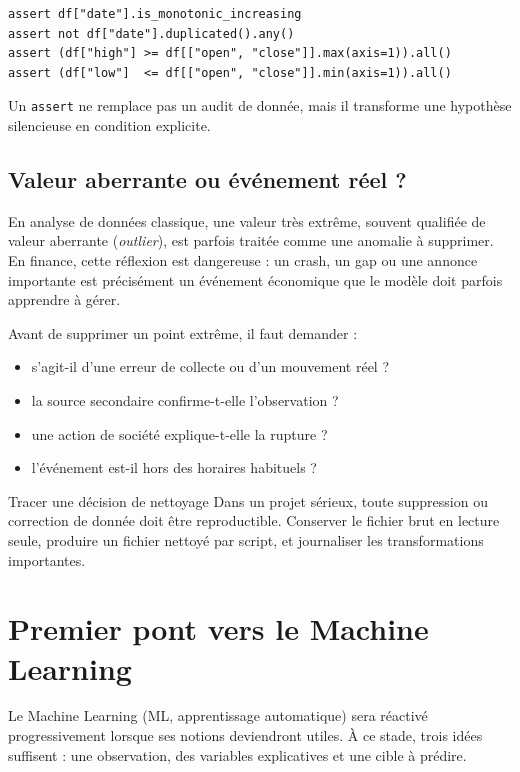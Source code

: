 \begin{lstlisting}
assert df["date"].is_monotonic_increasing
assert not df["date"].duplicated().any()
assert (df["high"] >= df[["open", "close"]].max(axis=1)).all()
assert (df["low"]  <= df[["open", "close"]].min(axis=1)).all()
\end{lstlisting}

Un \texttt{assert} ne remplace pas un audit de donnée, mais il transforme une hypothèse silencieuse en condition explicite.

\subsection{Valeur aberrante ou événement réel ?}

En analyse de données classique, une valeur très extrême, souvent qualifiée de valeur aberrante (\emph{outlier}), est parfois traitée comme une anomalie à supprimer. En finance, cette réflexion est dangereuse : un crash, un gap ou une annonce importante est précisément un événement économique que le modèle doit parfois apprendre à gérer.

Avant de supprimer un point extrême, il faut demander :
\begin{itemize}
    \item s'agit-il d'une erreur de collecte ou d'un mouvement réel ?
    \item la source secondaire confirme-t-elle l'observation ?
    \item une action de société explique-t-elle la rupture ?
    \item l'événement est-il hors des horaires habituels ?
\end{itemize}

\begin{engineerbox}{Tracer une décision de nettoyage}
Dans un projet sérieux, toute suppression ou correction de donnée doit être reproductible. Conserver le fichier brut en lecture seule, produire un fichier nettoyé par script, et journaliser les transformations importantes.
\end{engineerbox}

\section{Premier pont vers le Machine Learning}

Le Machine Learning (ML, apprentissage automatique) sera réactivé progressivement lorsque ses notions deviendront utiles. À ce stade, trois idées suffisent : une observation, des variables explicatives et une cible à prédire.

